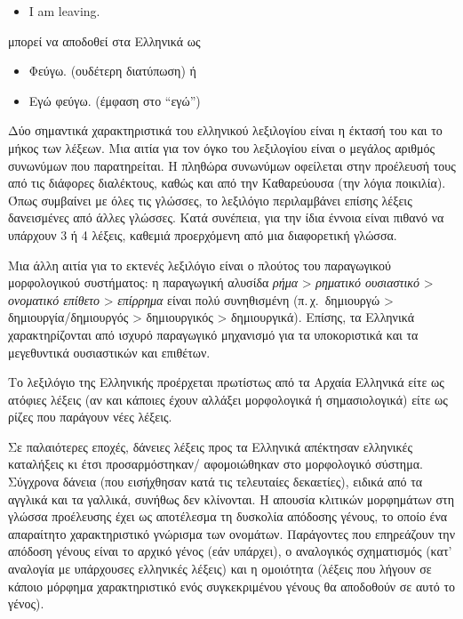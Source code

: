 \begin{multicols}{2}
\begin{itemize}
\item[] I am leaving.
\end{itemize}

μπορεί να αποδοθεί στα Ελληνικά ως

\begin{itemize}
\item Φεύγω. (ουδέτερη διατύπωση) ή 
\item Εγώ φεύγω. (έμφαση στο “εγώ”)
\end{itemize}

Δύο σημαντικά χαρακτηριστικά του ελληνικού λεξιλογίου είναι η έκτασή του και το μήκος των λέξεων. Μια αιτία για τον όγκο του λεξιλογίου είναι ο μεγάλος αριθμός συνωνύμων που παρατηρείται. Η πληθώρα συνωνύμων οφείλεται στην προέλευσή τους από τις διάφορες διαλέκτους, καθώς και από την Καθαρεύουσα (την λόγια ποικιλία). Όπως συμβαίνει με όλες τις γλώσσες, το λεξιλόγιο περιλαμβάνει επίσης λέξεις δανεισμένες από άλλες γλώσσες. Κατά συνέπεια, για την ίδια έννοια είναι πιθανό να υπάρχουν 3 ή 4 λέξεις, καθεμιά προερχόμενη από μια διαφορετική γλώσσα.

Μια άλλη αιτία για το εκτενές λεξιλόγιο είναι ο πλούτος του παραγωγικού μορφολογικού συστήματος: η παραγωγική αλυσίδα \textit{ρήμα} > \textit{ρηματικό ουσιαστικό} > \textit{ονοματικό επίθετο} > \textit{επίρρημα} είναι πολύ συνηθισμένη (π.\,χ.~δημιουργώ > δημιουργία/δημιουργός > δημιουργικός > δημιουργικά). Επίσης, τα Ελληνικά χαρακτηρίζονται από ισχυρό παραγωγικό μηχανισμό για τα υποκοριστικά και τα μεγεθυντικά ουσιαστικών και επιθέτων.

Το λεξιλόγιο της Ελληνικής προέρχεται πρωτίστως από τα Αρχαία Ελληνικά είτε ως ατόφιες λέξεις (αν και κάποιες έχουν αλλάξει μορφολογικά ή σημασιολογικά) είτε ως ρίζες που παράγουν νέες λέξεις.

Σε παλαιότερες εποχές, δάνειες λέξεις προς τα Ελληνικά απέκτησαν ελληνικές καταλήξεις κι έτσι προσαρμόστηκαν/ αφομοιώθηκαν στο μορφολογικό σύστημα. Σύγχρονα δάνεια (που εισήχθησαν κατά τις τελευταίες δεκαετίες), ειδικά από τα αγγλικά και τα γαλλικά, συνήθως δεν κλίνονται. Η απουσία κλιτικών μορφημάτων στη γλώσσα προέλευσης έχει ως αποτέλεσμα τη δυσκολία απόδοσης γένους, το οποίο ένα απαραίτητο χαρακτηριστικό γνώρισμα των ονομάτων. Παράγοντες που επηρεάζουν την απόδοση γένους είναι το αρχικό γένος (εάν υπάρχει), ο αναλογικός σχηματισμός (κατ' αναλογία με υπάρχουσες ελληνικές λέξεις) και η ομοιότητα (λέξεις που λήγουν σε κάποιο μόρφημα χαρακτηριστικό ενός συγκεκριμένου γένους θα αποδοθούν σε αυτό το γένος).


\end{multicols}
